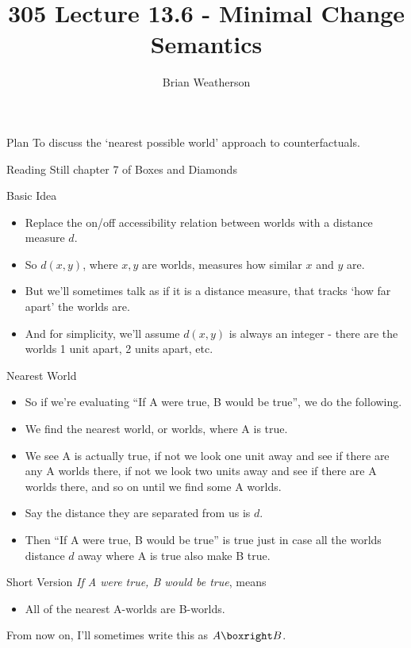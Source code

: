 \documentclass[
  ignorenonframetext,
]{beamer}
\title{305 Lecture 13.6 - Minimal Change Semantics}
\author{Brian Weatherson}
\date{}
\providecommand{\tightlist}{%
  \setlength{\itemsep}{0pt}\setlength{\parskip}{0pt}}
\renewcommand{\,}{\text{, }}
\begin{document}
\frame{\titlepage}

\begin{frame}{Plan}
\protect\hypertarget{plan}{}
To discuss the `nearest possible world' approach to counterfactuals.
\end{frame}

\begin{frame}{Reading}
\protect\hypertarget{reading}{}
Still chapter 7 of Boxes and Diamonds
\end{frame}

\begin{frame}{Basic Idea}
\protect\hypertarget{basic-idea}{}
\begin{itemize}
\tightlist
\item
  Replace the on/off accessibility relation between worlds with a
  distance measure \(d\).
\item
  So \(d(x, y)\), where \(x, y\) are worlds, measures how similar \(x\)
  and \(y\) are.
\item
  But we'll sometimes talk as if it is a distance measure, that tracks
  `how far apart' the worlds are.
\item
  And for simplicity, we'll assume \(d(x, y)\) is always an integer -
  there are the worlds 1 unit apart, 2 units apart, etc.
\end{itemize}
\end{frame}

\begin{frame}{Nearest World}
\protect\hypertarget{nearest-world}{}
\begin{itemize}
\tightlist
\item
  So if we're evaluating ``If A were true, B would be true'', we do the
  following.
\item
  We find the nearest world, or worlds, where A is true.
\item
  We see A is actually true, if not we look one unit away and see if
  there are any A worlds there, if not we look two units away and see if
  there are A worlds there, and so on until we find some A worlds.
\item
  Say the distance they are separated from us is \(d\).
\item
  Then ``If A were true, B would be true'' is true just in case all the
  worlds distance \(d\) away where A is true also make B true.
\end{itemize}
\end{frame}

\begin{frame}{Short Version}
\protect\hypertarget{short-version}{}
\emph{If A were true, B would be true}, means

\begin{itemize}
\tightlist
\item
  All of the nearest A-worlds are B-worlds.
\end{itemize}

From now on, I'll sometimes write this as \(A \boxright B\).
\end{frame}
\end{document}
